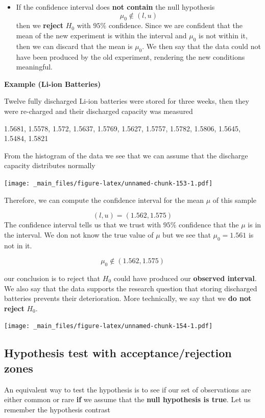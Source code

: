 \documentclass[
]{book}
\providecommand{\tightlist}{%
  \setlength{\itemsep}{0pt}\setlength{\parskip}{0pt}}
\begin{document}
\begin{itemize}
\tightlist
\item
  If the confidence interval does \textbf{not contain} the null hypothesis\[\mu_0\notin (l,u)\] then we \textbf{reject} \(H_0\) with \(95\%\) confidence. Since we are confident that the mean of the new experiment is within the interval and \(\mu_0\) is not within it, then we can discard that the mean is \(\mu_0\). We then say that the data could not have been produced by the old experiment, rendering the new conditions meaningful.
\end{itemize}

\textbf{Example (Li-ion Batteries)}

Twelve fully discharged Li-ion batteries were stored for three weeks, then they were re-charged and their discharged capacity was measured

1.5681, 1.5578, 1.572, 1.5637, 1.5769, 1.5627, 1.5757, 1.5782, 1.5806, 1.5645, 1.5484, 1.5821

From the histogram of the data we see that we can assume that the discharge capacity distributes normally

\texttt{[image: \_main\_files/figure-latex/unnamed-chunk-153-1.pdf]}

Therefore, we can compute the confidence interval for the mean \(\mu\) of this sample

\[(l,u)= (1.562, 1.575)\]
The confidence interval tells us that we trust with \(95\%\) confidence that the \(\mu\) is in the interval. We don not know the true value of \(\mu\) but we see that \(\mu_0=1.561\) is not in it.

\[\mu_0\notin (1.562, 1.575)\]

our conclusion is to reject that \(H_0\) could have produced our \textbf{observed interval}. We also say that the data supports the research question that storing discharged batteries prevents their deterioration. More technically, we say that we \textbf{do not reject} \(H_0\).

\texttt{[image: \_main\_files/figure-latex/unnamed-chunk-154-1.pdf]}

\hypertarget{hypothesis-test-with-acceptancerejection-zones}{%
\subsection{Hypothesis test with acceptance/rejection zones}\label{hypothesis-test-with-acceptancerejection-zones}}

An equivalent way to test the hypothesis is to see if our set of observations are either common or rare \textbf{if} we assume that the \textbf{null hypothesis is true}. Let us remember the hypothesis contrast
\end{document}
